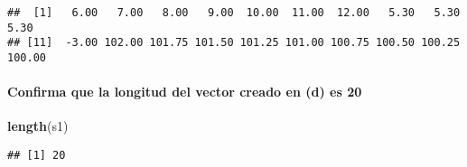 \documentclass[]{article}
\newenvironment{Shaded}{\begin{snugshade}}{\end{snugshade}}
\newcommand{\KeywordTok}[1]{\textcolor[rgb]{0.13,0.29,0.53}{\textbf{#1}}}
\newcommand{\NormalTok}[1]{#1}
\let\oldparagraph\paragraph
\renewcommand{\paragraph}[1]{\oldparagraph{#1}\mbox{}}
\begin{document}
\begin{verbatim}
##  [1]   6.00   7.00   8.00   9.00  10.00  11.00  12.00   5.30   5.30   5.30
## [11]  -3.00 102.00 101.75 101.50 101.25 101.00 100.75 100.50 100.25 100.00
\end{verbatim}

\paragraph{Confirma que la longitud del vector creado en (d) es
20}\label{confirma-que-la-longitud-del-vector-creado-en-d-es-20}

\begin{Shaded}
\begin{Highlighting}[]
\KeywordTok{length}\NormalTok{(s1)}
\end{Highlighting}
\end{Shaded}

\begin{verbatim}
## [1] 20
\end{verbatim}
\end{document}
